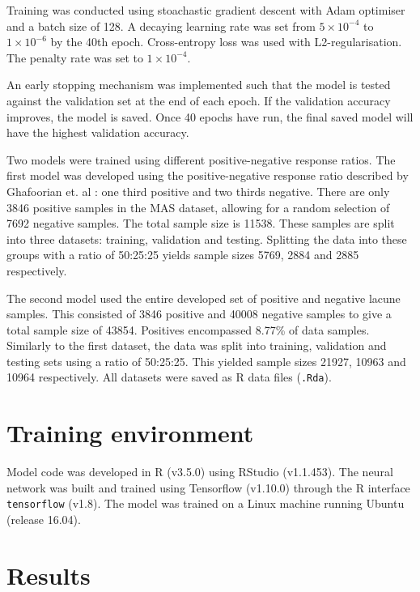 Training was conducted using stoachastic gradient descent with Adam optimiser and a batch size of 128. A decaying learning rate was set from $5\times10^{-4}$ to $1\times10^{-6}$ by the 40th epoch. Cross-entropy loss was used with L2-regularisation. The penalty rate was set to $1\times10^{-4}$. 

An early stopping mechanism was implemented such that the model is tested against the validation set at the end of each epoch. If the validation accuracy improves, the model is saved. Once 40 epochs have run, the final saved model will have the highest validation accuracy.

Two models were trained using different positive-negative response ratios. The first model was developed using the positive-negative response ratio described by Ghafoorian et. al \cite{GhafoorianM.2017Dml3}: one third positive and two thirds negative. There are only 3846 positive samples in the MAS dataset, allowing for a random selection of 7692 negative samples. The total sample size is 11538. These samples are split into three datasets: training, validation and testing. Splitting the data into these groups with a ratio of 50:25:25 yields sample sizes 5769, 2884 and 2885 respectively.

The second model used the entire developed set of positive and negative lacune samples. This consisted of 3846 positive and 40008 negative samples to give a total sample size of 43854. Positives encompassed 8.77\% of data samples. Similarly to the first dataset, the data was split into training, validation and testing sets using a ratio of 50:25:25. This yielded sample sizes 21927, 10963 and 10964 respectively. All datasets were saved as R data files (\texttt{.Rda}).


\section{Training environment}

Model code was developed in R (v3.5.0) using RStudio (v1.1.453). The neural network was built and trained using Tensorflow (v1.10.0) through the R interface \texttt{tensorflow} (v1.8). The model was trained on a Linux machine running Ubuntu (release 16.04). 

\section{Results}



